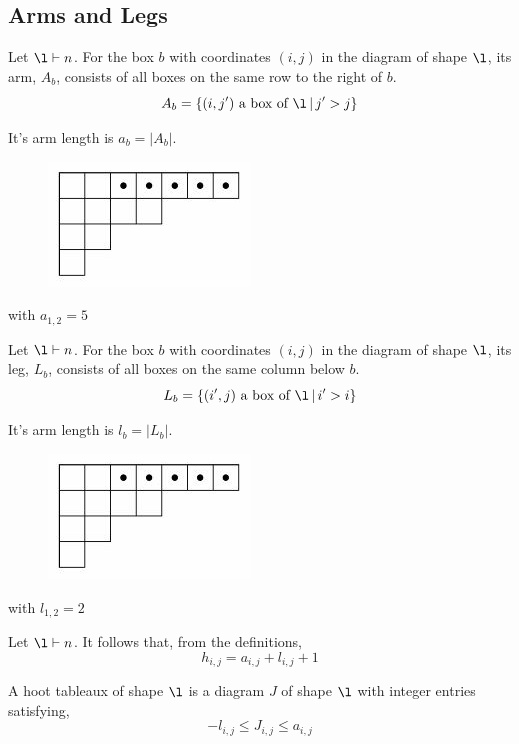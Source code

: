 \documentclass{article}
\begin{document}
\subsection{Arms and Legs}

\begin{ndefi}[Arms]
  Let $\l \vdash n$. For the box $b$ with coordinates $(i, j)$ in the diagram of shape $\l$, its arm, $A_b$, consists of all boxes on the same row to the right of $b$.
  $$ A_b = \{ (i, j') \text{ a box of } \l \,|\, j' > j\} $$
\end{ndefi}

It's arm length is $a_b = |A_b|$.

\begin{figure}[!ht]
  \centering
  \includegraphics{./figures/L3.1}
\end{figure}

with $a_{1, 2} = 5$

\begin{ndefi}[Legs]
  Let $\l \vdash n$. For the box $b$ with coordinates $(i, j)$ in the diagram of shape $\l$, its leg, $L_b$, consists of all boxes on the same column below $b$.
  $$ L_b = \{ (i', j) \text{ a box of } \l \,|\, i' > i\} $$
\end{ndefi}

It's arm length is $l_b = |L_b|$.

\begin{figure}[!ht]
  \centering
  \includegraphics{./figures/L3.1}
\end{figure}

with $l_{1, 2} = 2$

Let $\l \vdash n$. It follows that, from the definitions,
$$ h_{i, j} = a_{i,j} + l_{i, j} + 1 $$

\begin{ndefi}
  A hoot tableaux of shape $\l$ is a diagram $J$ of shape $\l$ with integer entries satisfying,
  $$ -l_{i,j} \le J_{i,j} \le a_{i,j} $$
\end{ndefi}
\end{document}
